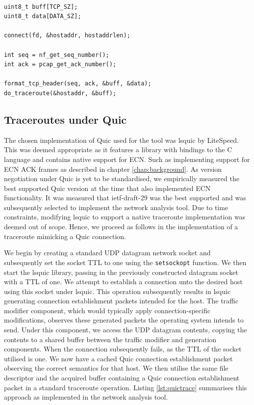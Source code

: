 \documentclass{l4proj}
\begin{document}
\begin{lstlisting}[caption={A demonstration of launching traceroutes during a TCP connection, implementation details such as the use of synchronisation primitives and error checking have been omitted for the sake of brevity},label={lst:tcpraw}]

uint8_t buff[TCP_SZ];
uint8_t data[DATA_SZ];

connect(fd, &hostaddr, hostaddrlen);

int seq = nf_get_seq_number();
int ack = pcap_get_ack_number();

format_tcp_header(seq, ack, &buff, &data);
do_traceroute(&hostaddr, &buff);

\end{lstlisting}


\subsection{Traceroutes under Quic}


The chosen implementation of Quic used for the tool was lsquic by LiteSpeed. This was deemed appropriate as it features a library with bindings to the C language and contains native support for ECN. Such as implementing support for ECN ACK frames as described in chapter \ref{chap:background}. As version negotiation under Quic is yet to be standardised, we empirically measured the best supported Quic version at the time that also implemented ECN functionality. It was measured that ietf-draft-29 was the best supported and was subsequently selected to implement the network analysis tool. Due to time constraints, modifying lsquic to support a native traceroute implementation was deemed out of scope. Hence, we proceed as follows in the implementation of a traceroute mimicking a Quic connection.

We begin by creating a standard UDP datagram network socket and subsequently set the socket TTL to one using the \lstinline{setsockopt} function. We then start the lsquic library, passing in the previously constructed datagram socket with a TTL of one. We attempt to establish a connection unto the desired host using this socket under lsquic. This operation subsequently results in lsquic generating connection establishment packets intended for the host. The traffic modifier component, which would typically apply connection-specific modifications, observes these generated packets the operating system intends to send. Under this component, we access the UDP datagram contents, copying the contents to a shared buffer between the traffic modifier and generation components. When the connection subsequently fails, as the TTL of the socket utilised is one. We now have a cached Quic connection establishment packet observing the correct semantics for that host. We then utilise the same file descriptor and the acquired buffer containing a Quic connection establishment packet in a standard traceroute operation. Listing \ref{lst:quictrace} summarises this approach as implemented in the network analysis tool.
\end{document}
